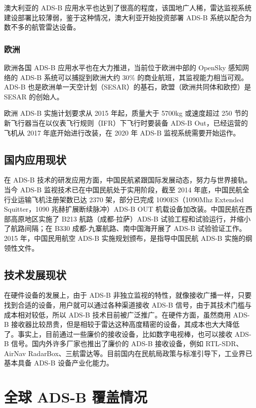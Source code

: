 澳大利亚的 ADS-B 应用水平也达到了很高的程度，该国地广人稀，雷达监视系统建设部署比较薄弱，鉴于这种情况，澳大利亚开始投资部署 ADS-B 系统以配合为数不多的航管雷达设备。

\subsubsection{欧洲}

欧洲各国 ADS-B 应用水平也在大力推进，当前位于欧洲中部的 OpenSky 感知网络的 ADS-B 系统可以捕捉到欧洲大约 30\% 的商业航班，其监视能力相当可观。ADS-B 也是欧洲单一天空计划（SESAR）的基石，欧盟（欧洲共同体和欧控）是 SESAR 的创始人。

欧洲 ADS-B 实施计划要求从 2015 年起，质量大于 5700kg 或速度超过 250 节的新飞行器当在以仪表飞行规则（IFR）下飞行时要装备 ADS-B Out，已经运营的飞机从 2017 年底开始进行改装，在 2020 年 ADS-B 监视系统需要开始运作。

\subsection{国内应用现状}

在 ADS-B 技术的研发应用方面，中国民航紧跟国际发展动态，努力与世界接轨。当今 ADS-B 监视技术已在中国民航处于实用阶段，截至 2014 年底，中国民航全行业运输飞机注册架数已达 2370 架，部分已完成 1090ES（1090Mhz Extended Squitter，1090 兆赫扩展断续脉冲）ADS-B OUT 机载设备加改装。中国民航在西部高原地区实施了 B213 航路（成都-拉萨）ADS-B 试验工程和试验运行，并缩小了航路间隔；在 B330 成都-九寨航路、南中国海开展了 ADS-B 试验验证工作。2015 年，中国民用航空 ADS-B 实施规划颁布，是指导中国民航 ADS-B 实施的纲领性文件。

\subsection{技术发展现状}

在硬件设备的发展上，由于 ADS-B 非独立监视的特性，就像接收广播一样，只要找到合适的设备，用户就可以通过各种渠道接收 ADS-B 信号，由于其技术门槛与
成本相对较低，所以 ADS-B 技术目前被广泛推广。在硬件方面，虽然商用 ADS-B 接收器比较昂贵，但是相较于雷达这种高度精密的设备，其成本也大大降低了。事实上，目前通过一些廉价的接收设备，比如数字电视棒，也可以接收 ADS-B 信号。国内外许多厂家也推出了廉价的 ADS-B 接收设备，例如 RTL-SDR、AirNav RadarBox、三航雷达等。目前国内在民航局政策与标准引导下，工业界已基本具备 ADS-B 设备产业化能力。

\section{全球 ADS-B 覆盖情况}

